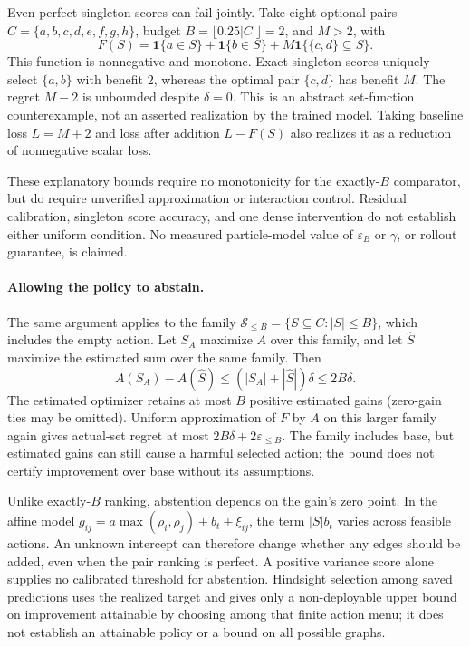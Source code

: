 Even perfect singleton scores can fail jointly. Take eight optional pairs
$C=\{a,b,c,d,e,f,g,h\}$, budget
$B=\lfloor0.25|C|\rfloor=2$, and $M>2$, with
\begin{equation}
 F(S)=\mathbf1\{a\in S\}+\mathbf1\{b\in S\}
       +M\mathbf1\{\{c,d\}\subseteq S\}.
\end{equation}
This function is nonnegative and monotone. Exact singleton scores uniquely
select $\{a,b\}$ with benefit $2$, whereas the optimal pair $\{c,d\}$ has
benefit $M$. The regret $M-2$ is unbounded despite $\delta=0$. This is an
abstract set-function counterexample, not an asserted realization by the
trained model. Taking baseline loss $L=M+2$ and loss after addition $L-F(S)$
also realizes it as a reduction of nonnegative scalar loss.

These explanatory bounds require no monotonicity for the exactly-$B$
comparator, but do require unverified approximation or interaction control.
Residual calibration, singleton score accuracy, and one dense intervention
do not establish either uniform condition. No measured particle-model value
of $\varepsilon_B$ or $\gamma$, or rollout guarantee, is claimed.


\paragraph{Allowing the policy to abstain.}
The same argument applies to the family $\mathcal S_{\le B}=\{S\subseteq C:|S|\le B\}$, which includes the empty action. Let $S_A$ maximize $A$ over this family, and let $\widehat S$ maximize the estimated sum over the same family. Then
\begin{equation}
 A(S_A)-A(\widehat S)\le (|S_A|+|\widehat S|)\delta\le2B\delta.
\end{equation}
The estimated optimizer retains at most $B$ positive estimated gains (zero-gain ties may be omitted). Uniform approximation of $F$ by $A$ on this larger family again gives actual-set regret at most $2B\delta+2\varepsilon_{\le B}$. The family includes base, but estimated gains can still cause a harmful selected action; the bound does not certify improvement over base without its assumptions.

Unlike exactly-$B$ ranking, abstention depends on the gain's zero point. In the affine model $g_{ij}=a\max(\rho_i,\rho_j)+b_t+\xi_{ij}$, the term $|S|b_t$ varies across feasible actions. An unknown intercept can therefore change whether any edges should be added, even when the pair ranking is perfect. A positive variance score alone supplies no calibrated threshold for abstention. Hindsight selection among saved predictions uses the realized target and gives only a non-deployable upper bound on improvement attainable by choosing among that finite action menu; it does not establish an attainable policy or a bound on all possible graphs.

